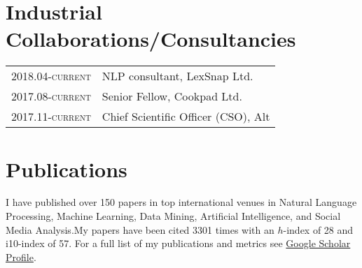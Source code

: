 \documentclass[a4paper,11pt]{article}
\begin{document}
\section{Industrial Collaborations/Consultancies}

\begin{tabular}{r p{11cm}}
\textsc{2018.04-current} & NLP consultant, LexSnap Ltd.\\
\textsc{2017.08-current} & Senior Fellow, Cookpad Ltd. \\
\textsc{2017.11-current} & Chief Scientific Officer (CSO), Alt \\
\end{tabular}


\newpage
\section{Publications}

I have published over 150 papers in top international venues in Natural Language Processing, Machine Learning, Data Mining, Artificial Intelligence, and Social Media Analysis.My papers have been cited 3301 times with an $h$-index of 28 and i10-index of 57.
For a full list of my publications and metrics see \href{https://goo.gl/mnhgp6}{Google Scholar Profile}.



%
\end{document}
